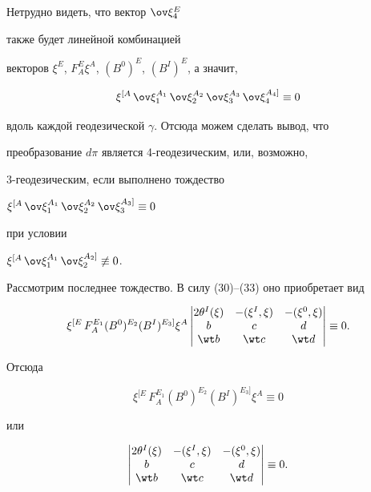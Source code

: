 Нетрудно видеть, что вектор $\ov\xi^E_4$


также будет линейной комбинацией


векторов $\xi^E$, $F^E_A\xi^A$, $(B^0)^E$, $(B^I)^E$, а значит,


$$


\xi^{[A}\,\ov\xi^{A_1}_1\,\ov\xi^{A_2}_2\,


\ov\xi^{A_3}_3\,\ov\xi^{A_4]}_4\equiv 0


$$


вдоль каждой геодезической $\gamma$. Отсюда можем сделать вывод, что


преобразование $d\pi$ является 4-геодезическим, или, возможно,


3-геодезическим, если выполнено тождество


$\xi^{[A}\,\ov\xi^{A_1}_1\,\ov\xi^{A_2}_2\,


\ov\xi^{A_3]}_3\equiv 0$


при условии


$\xi^{[A}\,\ov\xi^{A_1}_1\,\ov\xi^{A_2]}_2\not\equiv 0$.





Рассмотрим последнее тождество. В силу (30)--(33) оно приобретает вид


$$


\xi^{[E}\,F^{E_1}_A(B^0)^{E_2}(B^I)^{E_3]}\xi^A


\begin{vmatrix}


2\theta^I(\xi) & -(\xi^I,\xi) & -(\xi^0,\xi) \\


b & c & d \\ \wt b & \wt c & \wt d


\end{vmatrix}


\equiv 0.


$$


Отсюда


\begin{equation}


\xi^{[E}\,F^{E_1}_A(B^0)^{E_2}(B^I)^{E_3]}\xi^A\equiv 0


\end{equation}


или


\begin{equation}


\begin{vmatrix}


2\theta^I(\xi) & -(\xi^I,\xi) & -(\xi^0,\xi) \\


b & c & d \\ \wt b & \wt c & \wt d


\end{vmatrix}


\equiv 0.


\end{equation}


